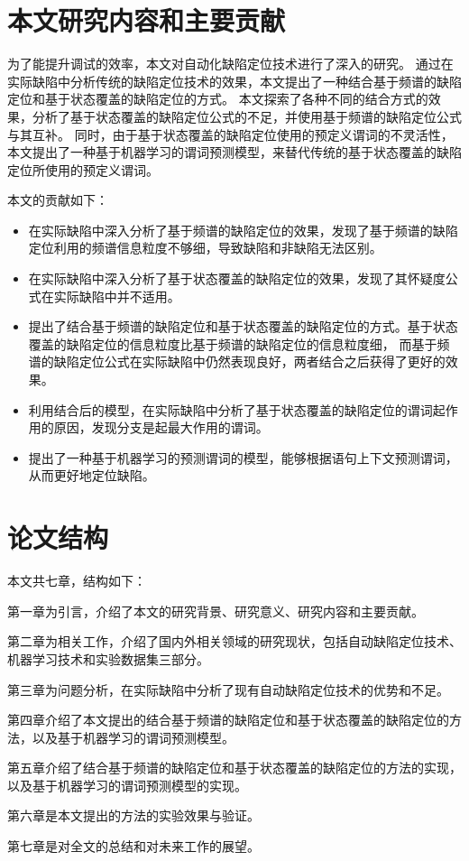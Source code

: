 \section{本文研究内容和主要贡献}

为了能提升调试的效率，本文对自动化缺陷定位技术进行了深入的研究。
通过在实际缺陷中分析传统的缺陷定位技术的效果，本文提出了一种结合基于频谱的缺陷定位和基于状态覆盖的缺陷定位的方式。
本文探索了各种不同的结合方式的效果，分析了基于状态覆盖的缺陷定位公式的不足，并使用基于频谱的缺陷定位公式与其互补。
同时，由于基于状态覆盖的缺陷定位使用的预定义谓词的不灵活性，
本文提出了一种基于机器学习的谓词预测模型，来替代传统的基于状态覆盖的缺陷定位所使用的预定义谓词。

本文的贡献如下：
\begin{itemize}
\item 在实际缺陷中深入分析了基于频谱的缺陷定位的效果，发现了基于频谱的缺陷定位利用的频谱信息粒度不够细，导致缺陷和非缺陷无法区别。
\item 在实际缺陷中深入分析了基于状态覆盖的缺陷定位的效果，发现了其怀疑度公式在实际缺陷中并不适用。
\item 提出了结合基于频谱的缺陷定位和基于状态覆盖的缺陷定位的方式。基于状态覆盖的缺陷定位的信息粒度比基于频谱的缺陷定位的信息粒度细，
而基于频谱的缺陷定位公式在实际缺陷中仍然表现良好，两者结合之后获得了更好的效果。
\item 利用结合后的模型，在实际缺陷中分析了基于状态覆盖的缺陷定位的谓词起作用的原因，发现分支是起最大作用的谓词。
\item 提出了一种基于机器学习的预测谓词的模型，能够根据语句上下文预测谓词，从而更好地定位缺陷。
\end{itemize}

\section{论文结构}

本文共七章，结构如下：

第一章为引言，介绍了本文的研究背景、研究意义、研究内容和主要贡献。

第二章为相关工作，介绍了国内外相关领域的研究现状，包括自动缺陷定位技术、机器学习技术和实验数据集三部分。

第三章为问题分析，在实际缺陷中分析了现有自动缺陷定位技术的优势和不足。

第四章介绍了本文提出的结合基于频谱的缺陷定位和基于状态覆盖的缺陷定位的方法，以及基于机器学习的谓词预测模型。

第五章介绍了结合基于频谱的缺陷定位和基于状态覆盖的缺陷定位的方法的实现，以及基于机器学习的谓词预测模型的实现。

第六章是本文提出的方法的实验效果与验证。

第七章是对全文的总结和对未来工作的展望。

